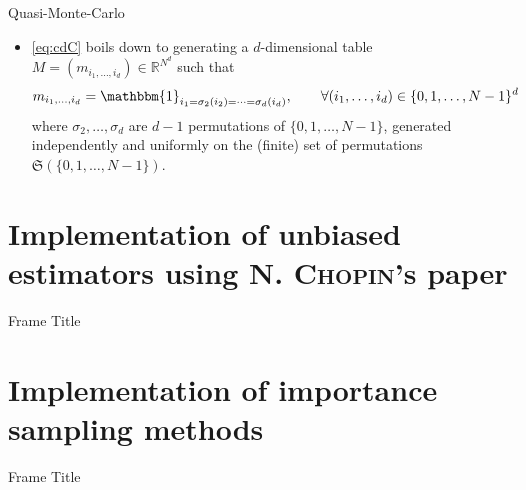 \documentclass[aspectratio=169,xcolor=dvipsnames]{beamer}
\newcommand{\bdOne}{\mathbbm{1}}
\begin{document}
    \begin{frame}{Quasi-Monte-Carlo}
        \begin{itemize}
            \item \eqref{eq:cdC} boils down to generating a $d$-dimensional table $M = (m_{i_1, \dots, i_d}) \in \mathbb{R}^{N^d}$ such that
            \[m_{i_1, \dots, i_d} = \bdOne_{i_1 = \sigma_2(i_2) = \cdots = \sigma_d(i_d)}, \qquad \forall (i_1, \dots, i_d) \in \{0, 1, \dots, N - 1\}^d\]
            where $\sigma_2, \dots, \sigma_d$ are $d - 1$ permutations of $\{0, 1, \dots, N - 1\}$, generated independently and uniformly on the (finite) set of permutations $\mathfrak{S}(\{0, 1, \dots, N - 1\})$.
        \end{itemize}
    \end{frame}

    \section{Implementation of unbiased estimators using N. \textsc{Chopin}'s paper}

    \begin{frame}{Frame Title}
        
    \end{frame}

    \section{Implementation of importance sampling methods}

    \begin{frame}{Frame Title}
        
    \end{frame}
\end{document}
